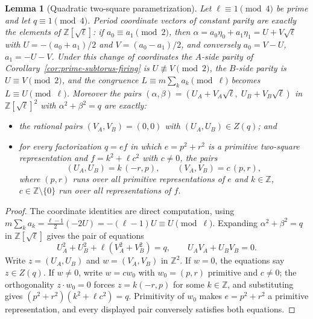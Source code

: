 \documentclass[11pt]{article}
\theoremstyle{plain}
\newtheorem{lemma}[theorem]{Lemma}
\theoremstyle{definition}
\theoremstyle{remark}
\newcommand{\Z}{\mathbb Z}
\begin{document}
\begin{lemma}[Quadratic two-square parametrization]\label{lem:quadratic-two-square}
Let $\ell\equiv1\pmod4$ be prime and let $q\equiv1\pmod4$.  Period coordinate
vectors of constant parity are exactly the elements of $\Z[\sqrt\ell]$: if
$a_0\equiv a_1\pmod2$, then $\alpha=a_0\eta_0+a_1\eta_1=U+V\sqrt\ell$ with
$U=-(a_0+a_1)/2$ and $V=(a_0-a_1)/2$, and conversely $a_0=V-U$, $a_1=-U-V$.
Under this change of coordinates the $A$-side parity of
Corollary~\ref{cor:prime-subtorus-firing} is $U\not\equiv V\pmod2$, the
$B$-side parity is $U\equiv V\pmod2$, and the congruence
$L\equiv m\sum_ka_k\pmod\ell$ becomes $L\equiv U\pmod\ell$.  Moreover the
pairs $(\alpha,\beta)=(U_A+V_A\sqrt\ell,\;U_B+V_B\sqrt\ell)$ in
$\Z[\sqrt\ell]^2$ with $\alpha^2+\beta^2=q$ are exactly:
\begin{itemize}
\item the rational pairs $(V_A,V_B)=(0,0)$ with $(U_A,U_B)\in Z(q)$; and
\item for every factorization $q=ef$ in which $e=p^2+r^2$ is a primitive
  two-square representation and $f=k^2+\ell c^2$ with $c\ne0$, the pairs
  \[
    (U_A,U_B)=k\,(-r,p),\qquad(V_A,V_B)=c\,(p,r),
  \]
  where $(p,r)$ runs over all primitive representations of $e$ and
  $k\in\Z$, $c\in\Z\setminus\{0\}$ run over all representations of $f$.
\end{itemize}
\end{lemma}

\begin{proof}
The coordinate identities are direct computation, using
$m\sum_ka_k=\tfrac{\ell-1}2(-2U)=-(\ell-1)U\equiv U\pmod\ell$.  Expanding
$\alpha^2+\beta^2=q$ in $\Z[\sqrt\ell]$ gives the pair of equations
\[
  U_A^2+U_B^2+\ell(V_A^2+V_B^2)=q,
  \qquad
  U_AV_A+U_BV_B=0 .
\]
Write $z=(U_A,U_B)$ and $w=(V_A,V_B)$ in $\Z^2$.  If $w=0$, the equations say
$z\in Z(q)$.  If $w\ne0$, write $w=cw_0$ with $w_0=(p,r)$ primitive and
$c\ne0$; the orthogonality $z\cdot w_0=0$ forces $z=k(-r,p)$ for some
$k\in\Z$, and substituting gives $(p^2+r^2)(k^2+\ell c^2)=q$.  Primitivity of
$w_0$ makes $e=p^2+r^2$ a primitive representation, and every displayed pair
conversely satisfies both equations.
\end{proof}
\end{document}

